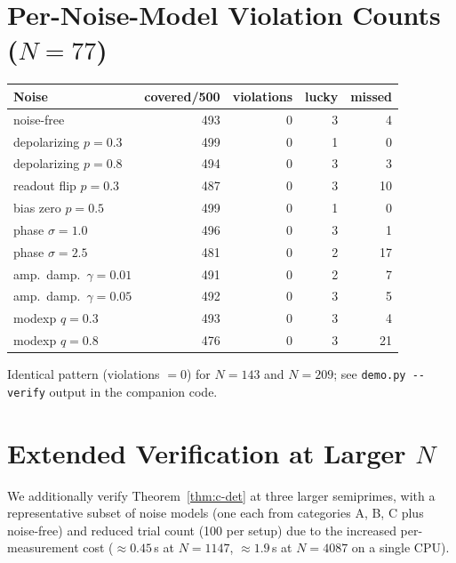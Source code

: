 \documentclass[11pt]{article}
\begin{document}
\section{Per-Noise-Model Violation Counts ($N = 77$)}
\label{app:tables}

\begin{center}
\begin{tabular}{lrrrr}
\toprule
Noise & covered/500 & violations & lucky & missed \\
\midrule
noise-free               & 493 & 0 & 3 & 4 \\
depolarizing $p=0.3$     & 499 & 0 & 1 & 0 \\
depolarizing $p=0.8$     & 494 & 0 & 3 & 3 \\
readout flip $p=0.3$     & 487 & 0 & 3 & 10 \\
bias zero $p=0.5$        & 499 & 0 & 1 & 0 \\
phase $\sigma=1.0$       & 496 & 0 & 3 & 1 \\
phase $\sigma=2.5$       & 481 & 0 & 2 & 17 \\
amp.\ damp.\ $\gamma=0.01$ & 491 & 0 & 2 & 7 \\
amp.\ damp.\ $\gamma=0.05$ & 492 & 0 & 3 & 5 \\
modexp $q=0.3$           & 493 & 0 & 3 & 4 \\
modexp $q=0.8$           & 476 & 0 & 3 & 21 \\
\bottomrule
\end{tabular}
\end{center}

\noindent
Identical pattern (violations $= 0$) for $N = 143$ and $N = 209$; see \texttt{demo.py -{}-verify} output in the companion code.

\section{Extended Verification at Larger $N$}
\label{app:large}

We additionally verify Theorem~\ref{thm:c-det} at three larger semiprimes, with a representative subset of noise models (one each from categories A, B, C plus noise-free) and reduced trial count (100 per setup) due to the increased per-measurement cost ($\approx 0.45$\,s at $N = 1147$, $\approx 1.9$\,s at $N = 4087$ on a single CPU).
\end{document}
